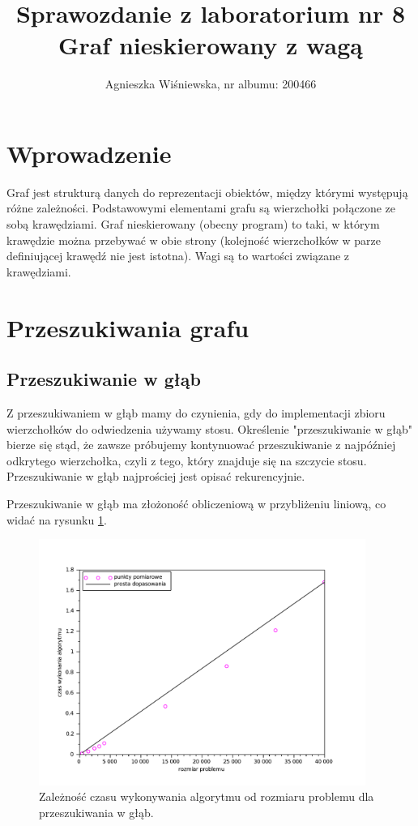 \documentclass{mwart}
\title{\Huge{Sprawozdanie z laboratorium nr 8\\
Graf nieskierowany z wagą }}
\author{Agnieszka Wiśniewska, nr albumu: 200466}
\begin{document}
\maketitle

\section{Wprowadzenie}
Graf jest strukturą danych do reprezentacji obiektów, między którymi występują różne zależności. Podstawowymi elementami grafu są wierzchołki połączone ze sobą krawędziami. Graf nieskierowany (obecny program) to taki, w którym krawędzie można przebywać w obie strony (kolejność wierzchołków w parze definiującej krawędź nie jest istotna). Wagi są to wartości związane z krawędziami.

\section{Przeszukiwania grafu}
\subsection{Przeszukiwanie w głąb}
Z przeszukiwaniem w głąb mamy do czynienia, gdy do implementacji zbioru wierzchołków do odwiedzenia używamy stosu. Określenie "przeszukiwanie w głąb" bierze się stąd, że zawsze próbujemy kontynuować przeszukiwanie z najpóźniej odkrytego wierzchołka, czyli z tego, który znajduje się na szczycie stosu. Przeszukiwanie w głąb najprościej jest opisać rekurencyjnie. 

Przeszukiwanie w głąb ma złożoność obliczeniową w przybliżeniu liniową, co widać na rysunku \ref{fdfs}.

\begin{figure}[!htp]
\centering
\includegraphics[width=0.95\textwidth]{dfs.pdf}
\caption{Zależność czasu wykonywania algorytmu od rozmiaru problemu dla przeszukiwania w głąb. \label{fdfs}} 
\end{figure}
\end{document}

